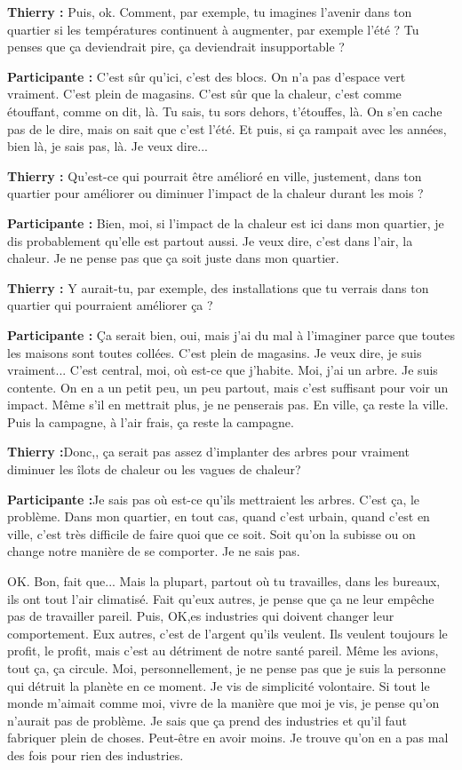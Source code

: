 \textbf{Thierry :} Puis, ok. Comment, par exemple, tu imagines l'avenir dans ton quartier si les températures continuent à augmenter, par exemple l'été ? Tu penses que ça deviendrait pire, ça deviendrait insupportable ?

\textbf{Participante :} C'est sûr qu'ici, c'est des blocs. On n'a pas d'espace vert vraiment. C'est plein de magasins. C'est sûr que la chaleur, c'est comme étouffant, comme on dit, là. Tu sais, tu sors dehors, t'étouffes, là. On s'en cache pas de le dire, mais on sait que c'est l'été. Et puis, si ça rampait avec les années, bien là, je sais pas, là. Je veux dire...

\textbf{Thierry :} Qu'est-ce qui pourrait être amélioré en ville, justement, dans ton quartier pour améliorer ou diminuer l'impact de la chaleur durant les mois ?

\textbf{Participante :} Bien, moi, si l'impact de la chaleur est ici dans mon quartier, je dis probablement qu'elle est partout aussi. Je veux dire, c'est dans l'air, la chaleur. Je ne pense pas que ça soit juste dans mon quartier.

\textbf{Thierry :} Y aurait-tu, par exemple, des installations que tu verrais dans ton quartier qui pourraient améliorer ça ?

\textbf{Participante :} Ça serait bien, oui, mais j'ai du mal à l'imaginer parce que toutes les maisons sont toutes collées. C'est plein de magasins. Je veux dire, je suis vraiment... C'est central, moi, où est-ce que j'habite. Moi, j'ai un arbre. Je suis contente. On en a un petit peu, un peu partout, mais c'est suffisant pour voir un impact. Même s'il en mettrait plus, je ne penserais pas. En ville, ça reste la ville. Puis la campagne, à l'air frais, ça reste la campagne. 

\textbf{Thierry :}Donc,, ça serait pas assez d'implanter des arbres pour vraiment diminuer les îlots de chaleur ou les vagues de chaleur? 

\textbf{Participante :}Je sais pas où est-ce qu'ils mettraient les arbres. C'est ça, le problème. Dans mon quartier, en tout cas, quand c'est urbain, quand c'est en ville, c'est très difficile de faire quoi que ce soit. Soit qu'on la subisse ou on change notre manière de se comporter. Je ne sais pas.

OK. Bon, fait que... Mais la plupart, partout où tu travailles, dans les bureaux, ils ont tout l'air climatisé. Fait qu'eux autres, je pense que ça ne leur empêche pas de travailler pareil. Puis, OK,es industries qui doivent changer leur comportement. Eux autres, c'est de l'argent qu'ils veulent. Ils veulent toujours le profit, le profit, mais c'est au détriment de notre santé pareil. Même les avions, tout ça, ça circule. Moi, personnellement, je ne pense pas que je suis la personne qui détruit la planète en ce moment. Je vis de simplicité volontaire. Si tout le monde m'aimait comme moi, vivre de la manière que moi je vis, je pense qu'on n'aurait pas de problème. Je sais que ça prend des industries et qu'il faut fabriquer plein de choses. Peut-être en avoir moins. Je trouve qu'on en a pas mal des fois pour rien des industries.

